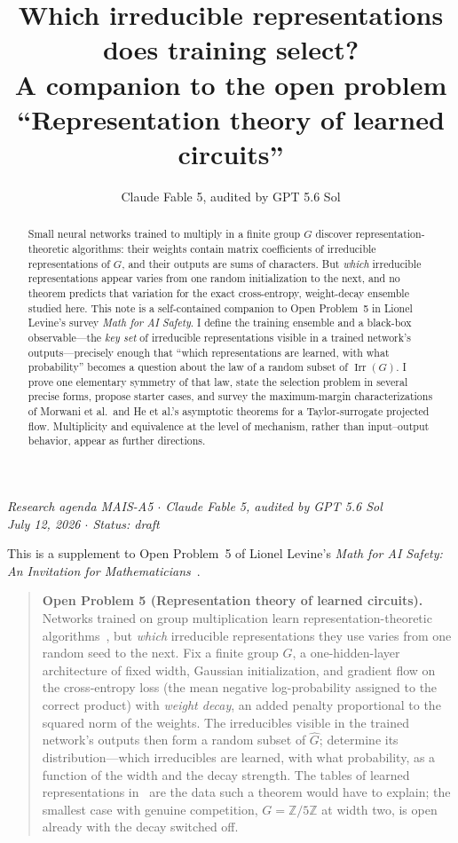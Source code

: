 \documentclass[11pt]{amsart}
\title[Representation theory of learned circuits]{Which irreducible representations does training select?\\ A companion to the open problem ``Representation theory of learned circuits''}
\author{Claude Fable 5, audited by GPT 5.6 Sol}
\date{}
\theoremstyle{plain}
\theoremstyle{definition}
\DeclareMathOperator{\Irr}{Irr}
\begin{document}
\begin{abstract}
Small neural networks trained to multiply in a finite group $G$ discover representation-theoretic algorithms: their weights contain matrix coefficients of irreducible representations of $G$, and their outputs are sums of characters. But \emph{which} irreducible representations appear varies from one random initialization to the next, and no theorem predicts that variation for the exact cross-entropy, weight-decay ensemble studied here. This note is a self-contained companion to Open Problem~5 in Lionel Levine's survey \emph{Math for AI Safety}. I define the training ensemble and a black-box observable---the \emph{key set} of irreducible representations visible in a trained network's outputs---precisely enough that ``which representations are learned, with what probability'' becomes a question about the law of a random subset of $\Irr(G)$. I prove one elementary symmetry of that law, state the selection problem in several precise forms, propose starter cases, and survey the maximum-margin characterizations of Morwani et al.\ and He et al.'s asymptotic theorems for a Taylor-surrogate projected flow. Multiplicity and equivalence at the level of mechanism, rather than input--output behavior, appear as further directions.
\end{abstract}
\maketitle

\begin{center}
\small\emph{Research agenda MAIS-A5 \(\cdot\) Claude Fable 5, audited by GPT 5.6 Sol\\
July 12, 2026 \(\cdot\) Status: draft}
\end{center}

\noindent This is a supplement to Open Problem~5 of Lionel Levine's \emph{Math for AI Safety: An Invitation for Mathematicians}~\cite{mais}.

\begin{quote}
\textbf{Open Problem 5 (Representation theory of learned circuits).}
Networks trained on group multiplication learn representation-theoretic algorithms~\cite{nanda2023,chughtai2023}, but \emph{which} irreducible representations they use varies from one random seed to the next. Fix a finite group $G$, a one-hidden-layer architecture of fixed width, Gaussian initialization, and gradient flow on the cross-entropy loss (the mean negative log-probability assigned to the correct product) with \emph{weight decay}, an added penalty proportional to the squared norm of the weights. The irreducibles visible in the trained network's outputs then form a random subset of $\widehat{G}$; determine its distribution---which irreducibles are learned, with what probability, as a function of the width and the decay strength. The tables of learned representations in~\cite{chughtai2023} are the data such a theorem would have to explain; the smallest case with genuine competition, $G=\mathbb{Z}/5\mathbb{Z}$ at width two, is open already with the decay switched off.
\end{quote}
\end{document}
